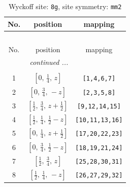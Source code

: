 \documentclass[fleqn,8pt]{jsarticle}
\begin{document}
\begin{longtable}{ccc}
\caption{Wyckoff site: {\tt 8g}, site symmetry: {\tt mm2}}
 \\
 \hline \hline
No. & position & mapping \\ \hline \endfirsthead

\multicolumn{2}{l}{\tablename\ \thetable{}} \\
 \hline \hline
No. & position & mapping \\ \hline \endhead

 \hline \hline
\multicolumn{2}{r}{\footnotesize\it continued ...} \\ \endfoot

 \hline \hline
\multicolumn{2}{r}{} \\ \endlastfoot

1 & $\left[ 0,\, \frac{1}{4},\, z \right]$ & {\tt [1,4,6,7]} \\ \hline
2 & $\left[ 0,\, \frac{3}{4},\, - z \right]$ & {\tt [2,3,5,8]} \\ \hline
3 & $\left[ \frac{1}{2},\, \frac{3}{4},\, z + \frac{1}{2} \right]$ & {\tt [9,12,14,15]} \\ \hline
4 & $\left[ \frac{1}{2},\, \frac{1}{4},\, \frac{1}{2} - z \right]$ & {\tt [10,11,13,16]} \\ \hline
5 & $\left[ 0,\, \frac{1}{4},\, z + \frac{1}{2} \right]$ & {\tt [17,20,22,23]} \\ \hline
6 & $\left[ 0,\, \frac{3}{4},\, \frac{1}{2} - z \right]$ & {\tt [18,19,21,24]} \\ \hline
7 & $\left[ \frac{1}{2},\, \frac{3}{4},\, z \right]$ & {\tt [25,28,30,31]} \\ \hline
8 & $\left[ \frac{1}{2},\, \frac{1}{4},\, - z \right]$ & {\tt [26,27,29,32]} \\
\end{longtable}
\renewcommand{\arraystretch}{1.2}
\end{document}
